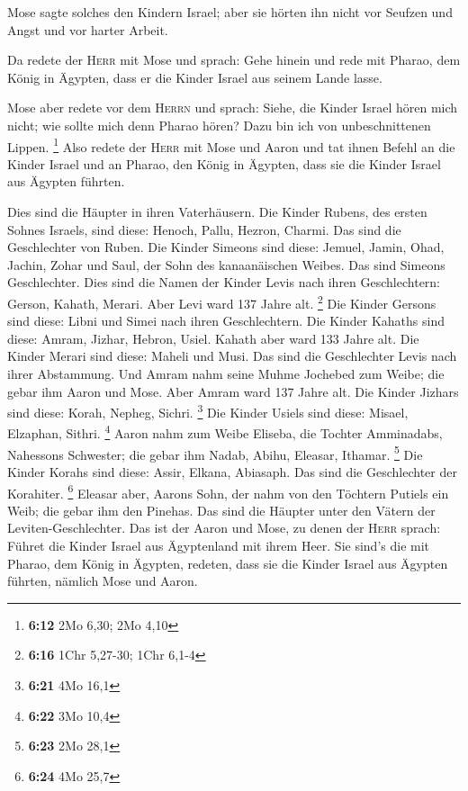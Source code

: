  Mose sagte solches den Kindern Israel; aber sie hörten
ihn nicht vor Seufzen und Angst und vor harter Arbeit.

 Da redete der \textsc{Herr} mit Mose und sprach:
 Gehe hinein und rede mit Pharao, dem König in Ägypten,
dass er die Kinder Israel aus seinem Lande lasse.

 Mose aber redete vor dem \textsc{Herrn} und sprach:
Siehe, die Kinder Israel hören mich nicht; wie sollte mich denn Pharao
hören? Dazu bin ich von unbeschnittenen Lippen. \footnote{\textbf{6:12}
  2Mo 6,30; 2Mo 4,10}  Also redete der \textsc{Herr} mit
Mose und Aaron und tat ihnen Befehl an die Kinder Israel und an Pharao,
den König in Ägypten, dass sie die Kinder Israel aus Ägypten führten.

 Dies sind die Häupter in ihren Vaterhäusern. Die Kinder
Rubens, des ersten Sohnes Israels, sind diese: Henoch, Pallu, Hezron,
Charmi. Das sind die Geschlechter von Ruben.  Die Kinder
Simeons sind diese: Jemuel, Jamin, Ohad, Jachin, Zohar und Saul, der
Sohn des kanaanäischen Weibes. Das sind Simeons Geschlechter.
 Dies sind die Namen der Kinder Levis nach ihren
Geschlechtern: Gerson, Kahath, Merari. Aber Levi ward 137 Jahre alt.
\footnote{\textbf{6:16} 1Chr 5,27-30; 1Chr 6,1-4}  Die
Kinder Gersons sind diese: Libni und Simei nach ihren Geschlechtern.
 Die Kinder Kahaths sind diese: Amram, Jizhar, Hebron,
Usiel. Kahath aber ward 133 Jahre alt.  Die Kinder Merari
sind diese: Maheli und Musi. Das sind die Geschlechter Levis nach ihrer
Abstammung.  Und Amram nahm seine Muhme Jochebed zum
Weibe; die gebar ihm Aaron und Mose. Aber Amram ward 137 Jahre alt.
 Die Kinder Jizhars sind diese: Korah, Nepheg, Sichri.
\footnote{\textbf{6:21} 4Mo 16,1}  Die Kinder Usiels sind
diese: Misael, Elzaphan, Sithri. \footnote{\textbf{6:22} 3Mo 10,4}
 Aaron nahm zum Weibe Eliseba, die Tochter Amminadabs,
Nahessons Schwester; die gebar ihm Nadab, Abihu, Eleasar, Ithamar.
\footnote{\textbf{6:23} 2Mo 28,1}  Die Kinder Korahs sind
diese: Assir, Elkana, Abiasaph. Das sind die Geschlechter der Korahiter.
\footnote{\textbf{6:24} 4Mo 25,7}  Eleasar aber, Aarons
Sohn, der nahm von den Töchtern Putiels ein Weib; die gebar ihm den
Pinehas. Das sind die Häupter unter den Vätern der Leviten-Geschlechter.
 Das ist der Aaron und Mose, zu denen der \textsc{Herr}
sprach: Führet die Kinder Israel aus Ägyptenland mit ihrem Heer.
 Sie sind's die mit Pharao, dem König in Ägypten,
redeten, dass sie die Kinder Israel aus Ägypten führten, nämlich Mose
und Aaron.

